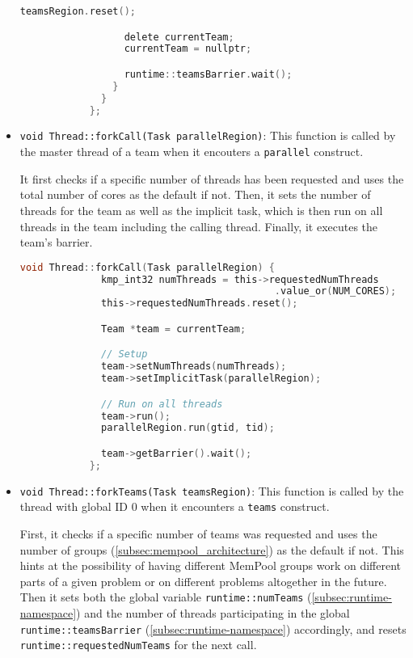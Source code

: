\begin{itemize}
\begin{lstlisting}[language=C, caption={Thread::run}, label={lst:thread-run},
          escapechar=@]
                  teamsRegion.reset();

                  delete currentTeam;
                  currentTeam = nullptr;

                  runtime::teamsBarrier.wait();
                }
              }
            };
          \end{lstlisting}

	\item \texttt{void Thread::forkCall(Task parallelRegion)}: This function is called by the master
	      thread of a team when it encouters a \texttt{parallel} construct.

	      It first checks if a specific number of threads has been requested and uses the total
	      number of cores as the default if not. Then, it sets the number of threads for the team as
	      well as the implicit task, which is then run on all threads in the team including the
	      calling thread. Finally, it executes the team's barrier.

	      \begin{lstlisting}[language=C, caption={Thread::forkCall},
          label={lst:thread-forkCall},
          escapechar=@]
            void Thread::forkCall(Task parallelRegion) {
              kmp_int32 numThreads = this->requestedNumThreads
                                            .value_or(NUM_CORES);
              this->requestedNumThreads.reset();

              Team *team = currentTeam;

              // Setup
              team->setNumThreads(numThreads);
              team->setImplicitTask(parallelRegion);

              // Run on all threads
              team->run();
              parallelRegion.run(gtid, tid);

              team->getBarrier().wait();
            };
    \end{lstlisting}

	\item \texttt{void Thread::forkTeams(Task teamsRegion)}: \label{subsec:thread-forkteams} This
          function is called by the thread with global ID 0 when it encounters a \texttt{teams}
          construct.

	      First, it checks if a specific number of teams was requested and uses the number of groups
	      (\cref{subsec:mempool_architecture}) as the default if not. This hints at the possibility
	      of having different MemPool groups work on different parts of a given problem or on
	      different problems altogether in the future. Then it sets both the global variable
	      \texttt{runtime::numTeams} (\cref{subsec:runtime-namespace}) and the number of threads
	      participating in the global \texttt{runtime::teamsBarrier}
	      (\cref{subsec:runtime-namespace}) accordingly, and resets
	      \texttt{runtime::requestedNumTeams} for the next call.


\end{itemize}
